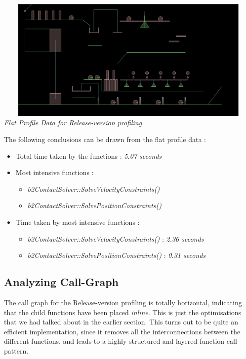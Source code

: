 \documentclass[a4paper,11pt]{article}
\begin{document}
\begin{center}
\includegraphics[width=195mm, height=60mm]{state_00.eps}\\
\emph{Flat Profile Data for Release-version profiling}
\end{center}

The following conclusions can be drawn from the flat profile data :

\begin{itemize}

\item Total time taken by the functions : \emph{5.07 seconds}
\item Most intensive functions : 
\begin{itemize}
\item \emph{b2ContactSolver::SolveVelocityConstraints()}
\item \emph{b2ContactSolver::SolvePositionConstraints()}
\end{itemize}
\item Time taken by most intensive functions : 
\begin{itemize}
\item \emph{b2ContactSolver::SolveVelocityConstraints()} : \emph{2.36 seconds}
\item \emph{b2ContactSolver::SolvePositionConstraints()} : \emph{0.31 seconds}
\end{itemize}

\end{itemize}

\subsection{Analyzing Call-Graph}

The call graph for the Release-version profiling is totally horizontal, indicating that the child functions have been placed \emph{inline}. This is just the optimisations that we had talked about in the earlier section. This turns out to be quite an efficient implementation, since it removes all the interconnections between the different functions, and leads to a highly structured and layered function call pattern.
\end{document}
